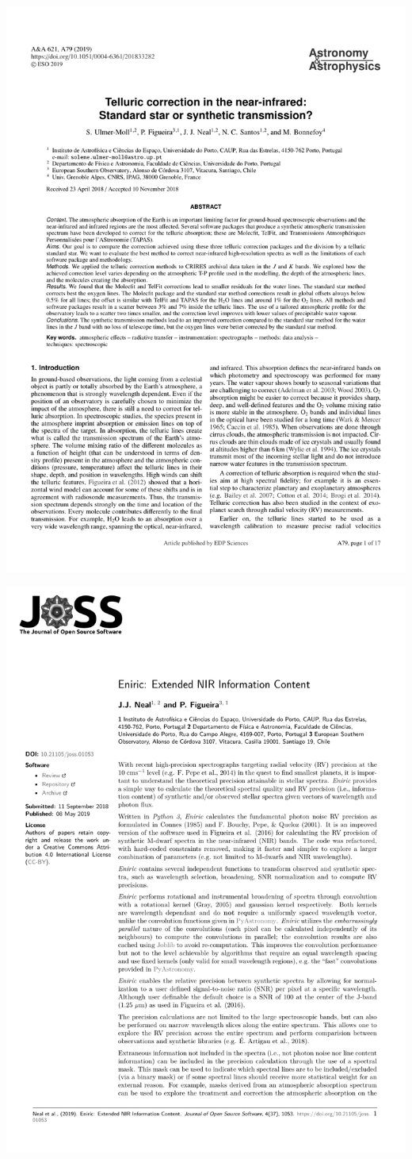 {%
    { \includegraphics[width=0.9\linewidth, keepaspectratio=true, page = 1, trim = 1.3cm 1cm 1.3cm 1cm, clip = true]{appendices/papers/Ulmer-moll2018_grey.pdf}}

{ \includegraphics[width=0.9\linewidth, keepaspectratio=true, page = 1, trim = 0.5cm 0.5cm 0.5cm 0.5cm, clip = true]{appendices/papers/Neal2019_grey.pdf}}

}